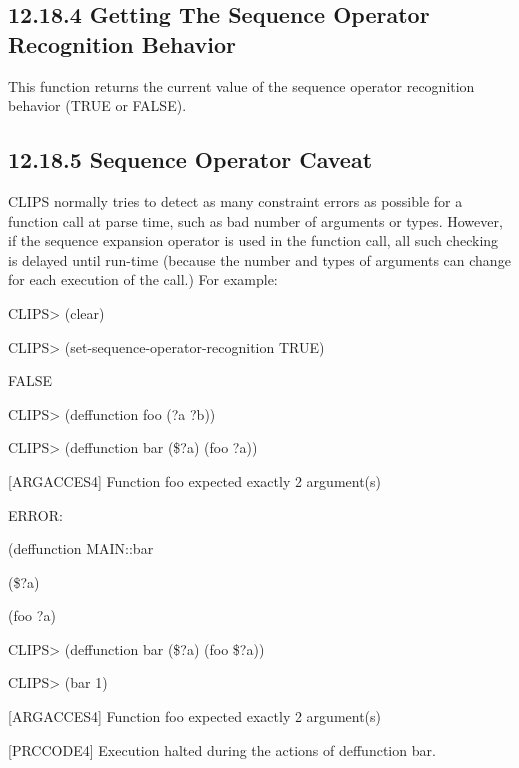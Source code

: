 \documentclass[letterpaper,10pt,english]{sphinxmanual}
\begin{document}
\subsection{12.18.4 Getting The Sequence Operator Recognition Behavior}
\label{\detokenize{actions:getting-the-sequence-operator-recognition-behavior}}
This function returns the current value of the sequence operator
recognition behavior (TRUE or FALSE).


\begin{sphinxVerbatim}[commandchars=\\\{\}]
\end{sphinxVerbatim}


\subsection{12.18.5 Sequence Operator Caveat}
\label{\detokenize{actions:sequence-operator-caveat}}
CLIPS normally tries to detect as many constraint errors as possible for
a function call at parse time, such as bad number of arguments or types.
However, if the sequence expansion operator is used in the function
call, all such checking is delayed until run-time (because the number
and types of arguments can change for each execution of the call.) For
example:

CLIPS\textgreater{} (clear)

CLIPS\textgreater{} (set-sequence-operator-recognition TRUE)

FALSE

CLIPS\textgreater{} (deffunction foo (?a ?b))

CLIPS\textgreater{} (deffunction bar (\$?a) (foo ?a))

{[}ARGACCES4{]} Function foo expected exactly 2 argument(s)

ERROR:

(deffunction MAIN::bar

(\$?a)

(foo ?a)

CLIPS\textgreater{} (deffunction bar (\$?a) (foo \$?a))

CLIPS\textgreater{} (bar 1)

{[}ARGACCES4{]} Function foo expected exactly 2 argument(s)

{[}PRCCODE4{]} Execution halted during the actions of deffunction bar.
\end{document}
